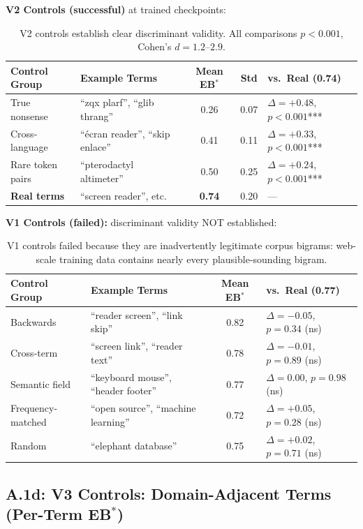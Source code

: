 \documentclass[10pt]{article} %
\begin{document}
\noindent\textbf{V2 Controls (successful)} at trained checkpoints:

\begin{table}[H]
\centering
\small
\begin{tabular}{|l|l|c|c|l|}
\hline
\textbf{Control Group} & \textbf{Example Terms} & \textbf{Mean EB$^*$} & \textbf{Std} & \textbf{vs.\ Real (0.74)} \\
\hline
True nonsense & ``zqx plarf'', ``glib thrang'' & 0.26 & 0.07 & $\Delta=+0.48$, $p<0.001$*** \\
Cross-language & ``\'ecran reader'', ``skip enlace'' & 0.41 & 0.11 & $\Delta=+0.33$, $p<0.001$*** \\
Rare token pairs & ``pterodactyl altimeter'' & 0.50 & 0.25 & $\Delta=+0.24$, $p<0.001$*** \\
\textbf{Real terms} & ``screen reader'', etc. & \textbf{0.74} & 0.20 & --- \\
\hline
\end{tabular}
\caption{V2 controls establish clear discriminant validity. All comparisons $p<0.001$, Cohen's $d=1.2$--$2.9$.}
\end{table}

\noindent\textbf{V1 Controls (failed):} discriminant validity NOT established:

\begin{table}[H]
\centering
\small
\begin{tabular}{|l|l|c|l|}
\hline
\textbf{Control Group} & \textbf{Example Terms} & \textbf{Mean EB$^*$} & \textbf{vs.\ Real (0.77)} \\
\hline
Backwards & ``reader screen'', ``link skip'' & 0.82 & $\Delta=-0.05$, $p=0.34$ (ns) \\
Cross-term & ``screen link'', ``reader text'' & 0.78 & $\Delta=-0.01$, $p=0.89$ (ns) \\
Semantic field & ``keyboard mouse'', ``header footer'' & 0.77 & $\Delta=0.00$, $p=0.98$ (ns) \\
Frequency-matched & ``open source'', ``machine learning'' & 0.72 & $\Delta=+0.05$, $p=0.28$ (ns) \\
Random & ``elephant database'' & 0.75 & $\Delta=+0.02$, $p=0.71$ (ns) \\
\hline
\end{tabular}
\caption{V1 controls failed because they are inadvertently legitimate corpus bigrams: web-scale training data contains nearly every plausible-sounding bigram.}
\end{table}

\subsection*{A.1d: V3 Controls: Domain-Adjacent Terms (Per-Term EB$^*$)}\mbox{}
\label{sec:a1d_v3}
\end{document}
